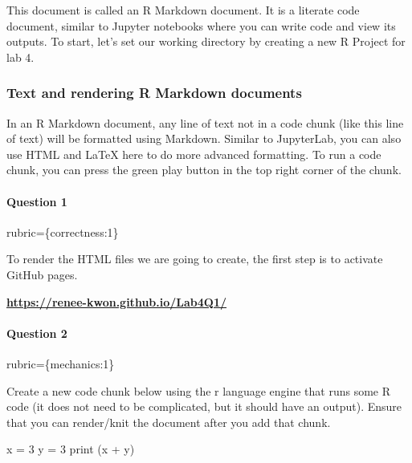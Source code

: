 \documentclass[
]{article}
\newenvironment{Shaded}{\begin{snugshade}}{\end{snugshade}}
\newcommand{\DecValTok}[1]{\textcolor[rgb]{0.00,0.00,0.81}{#1}}
\newcommand{\FunctionTok}[1]{\textcolor[rgb]{0.00,0.00,0.00}{#1}}
\newcommand{\NormalTok}[1]{#1}
\newcommand{\OtherTok}[1]{\textcolor[rgb]{0.56,0.35,0.01}{#1}}
\newcommand{\SpecialCharTok}[1]{\textcolor[rgb]{0.00,0.00,0.00}{#1}}
\begin{document}
This document is called an R Markdown document. It is a literate code
document, similar to Jupyter notebooks where you can write code and view
its outputs. To start, let's set our working directory by creating a new
R Project for lab 4.

\hypertarget{text-and-rendering-r-markdown-documents}{%
\subsubsection{Text and rendering R Markdown
documents}\label{text-and-rendering-r-markdown-documents}}

In an R Markdown document, any line of text not in a code chunk (like
this line of text) will be formatted using Markdown. Similar to
JupyterLab, you can also use HTML and LaTeX here to do more advanced
formatting. To run a code chunk, you can press the green play button in
the top right corner of the chunk.

\begin{alert alert-info}
\hypertarget{question-1}{%
\paragraph{Question 1}\label{question-1}}

rubric=\{correctness:1\}

To render the HTML files we are going to create, the first step is to
activate GitHub pages.
\end{alert alert-info}

\href{https://renee-kwon.github.io/Lab4Q1/}{\textbf{https://renee-kwon.github.io/Lab4Q1/}}

\begin{alert alert-info}
\hypertarget{question-2}{%
\paragraph{Question 2}\label{question-2}}

rubric=\{mechanics:1\}

Create a new code chunk below using the r language engine that runs some
R code (it does not need to be complicated, but it should have an
output). Ensure that you can render/knit the document after you add that
chunk.
\end{alert alert-info}

\begin{Shaded}
\begin{Highlighting}[]
\NormalTok{x }\OtherTok{=} \DecValTok{3} 
\NormalTok{y }\OtherTok{=} \DecValTok{3}
\FunctionTok{print}\NormalTok{ (x }\SpecialCharTok{+}\NormalTok{ y)}
\end{Highlighting}
\end{Shaded}
\end{document}
